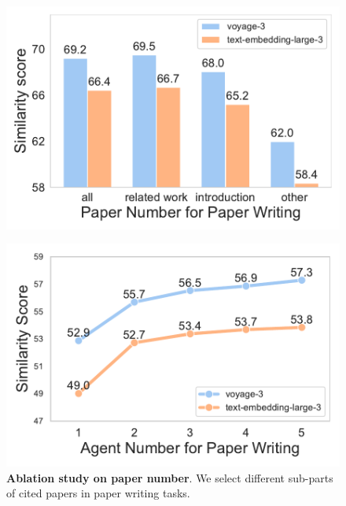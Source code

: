\begin{figure}[t]
    \centering
    \begin{minipage}[t]{0.31\linewidth}
        \centering
        \includegraphics[width=\linewidth]{./figs/ablation_study_on_paper_number_with_seaborn.pdf}
        \par\vspace{-2.5mm}
        \caption{\textbf{Ablation study on paper number}. We select different sub-parts of cited papers in paper writing tasks.}
        \vspace{-2.5mm}
        \label{paper_writing_paper_number}
    \end{minipage}\hfill
    \begin{minipage}[t]{0.31\linewidth}
        \centering
        \includegraphics[width=\linewidth]{./figs/ablation_study_on_agent_number_with_seaborn_voyage.pdf}
        \par\vspace{-2.5mm}

\end{minipage}
\end{figure}
